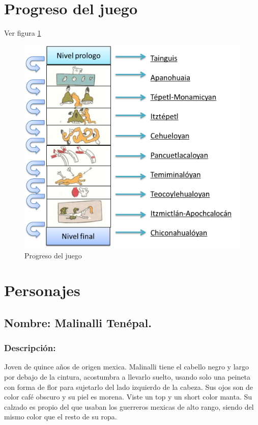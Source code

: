 \documentclass[11pt,letterpaper]{article}
\begin{document}
\section{Progreso del juego}
Ver figura \ref{fig:ProgJuego}
\begin{figure}
  \centering
     \includegraphics[width=\linewidth]{Imagenes/lineaJuego}
  \caption{Progreso del juego}
  \label{fig:ProgJuego}
\end{figure} 

\section{Personajes}

\subsection{Nombre: Malinalli Tenépal.} 
	\subsubsection{Descripción:}
Joven de quince años de origen mexica. Malinalli tiene el cabello negro y largo por debajo de la cintura, acostumbra a llevarlo suelto, usando solo una peineta con forma de flor para sujetarlo del lado izquierdo de la cabeza. Sus ojos son de color café obscuro y su piel es morena. Viste un top y un short color manta. Su calzado es propio del que usaban los guerreros mexicas de alto rango, siendo del mismo color que el resto de su ropa.   
\end{document}
